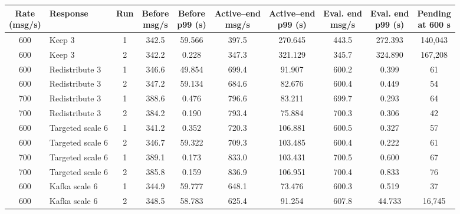 \clearpage
\begin{table}[!htbp]
\centering\footnotesize
\setlength{\tabcolsep}{2pt}
\renewcommand{\arraystretch}{1.12}
\begin{tabular}{@{}clcccccccc@{}}
\toprule
\rowcolor[HTML]{DDE3EA}
\shortstack{Rate\\(msg/s)} & Response & Run & \shortstack{Before\\msg/s} & \shortstack{Before\\p99 (s)} & \shortstack{Active--end\\msg/s} & \shortstack{Active--end\\p99 (s)} & \shortstack{Eval. end\\msg/s} & \shortstack{Eval. end\\p99 (s)} & \shortstack{Pending\\at 600 s}\\
\midrule
\rowcolor[HTML]{FFE1AD}
600 & Keep 3 & 1 & 342.5 & 59.566 & 397.5 & 270.645 & 443.5 & 272.393 & 140,043\\
\rowcolor[HTML]{FFE1AD}
600 & Keep 3 & 2 & 342.2 & 0.228 & 347.3 & 321.129 & 345.7 & 324.890 & 167,208\\
\rowcolor[HTML]{FFE1AD}
600 & Redistribute 3 & 1 & 346.6 & 49.854 & 699.4 & 91.907 & 600.2 & 0.399 & 61\\
\rowcolor[HTML]{FFE1AD}
600 & Redistribute 3 & 2 & 347.2 & 59.134 & 684.6 & 82.676 & 600.4 & 0.449 & 54\\
\rowcolor[HTML]{CFE2F3}
700 & Redistribute 3 & 1 & 388.6 & 0.476 & 796.6 & 83.211 & 699.7 & 0.293 & 64\\
\rowcolor[HTML]{CFE2F3}
700 & Redistribute 3 & 2 & 384.2 & 0.190 & 793.4 & 75.884 & 700.3 & 0.306 & 42\\
\rowcolor[HTML]{FFE1AD}
600 & Targeted scale 6 & 1 & 341.2 & 0.352 & 720.3 & 106.881 & 600.5 & 0.327 & 57\\
\rowcolor[HTML]{FFE1AD}
600 & Targeted scale 6 & 2 & 346.7 & 59.322 & 709.3 & 103.485 & 600.4 & 0.222 & 61\\
\rowcolor[HTML]{CFE2F3}
700 & Targeted scale 6 & 1 & 389.1 & 0.173 & 833.0 & 103.431 & 700.5 & 0.600 & 67\\
\rowcolor[HTML]{CFE2F3}
700 & Targeted scale 6 & 2 & 385.8 & 0.159 & 836.9 & 106.951 & 700.4 & 0.833 & 76\\
\rowcolor[HTML]{FFE1AD}
600 & Kafka scale 6 & 1 & 344.9 & 59.777 & 648.1 & 73.476 & 600.3 & 0.519 & 37\\
\rowcolor[HTML]{FFE1AD}
600 & Kafka scale 6 & 2 & 348.5 & 58.783 & 625.4 & 91.254 & 607.8 & 44.733 & 16,745\\

\end{tabular}
\end{table}
